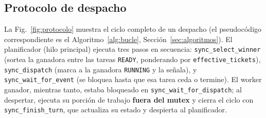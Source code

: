 \subsection{Protocolo de despacho}
\label{sec:protocolo}

La Fig.~\ref{fig:protocolo} muestra el ciclo completo de un despacho (el
pseudocódigo correspondiente es el Algoritmo~\ref{alg:bucle},
Sección~\ref{sec:algoritmos}). El planificador (hilo principal) ejecuta
tres pasos en secuencia:
\texttt{sync\_select\_winner} (sortea la ganadora entre las tareas
\texttt{READY}, ponderando por \texttt{effective\_tickets}),
\texttt{sync\_dispatch} (marca a la ganadora \texttt{RUNNING} y la señala), y
\texttt{sync\_wait\_for\_event} (se bloquea hasta que esa tarea ceda o
termine). El worker ganador, mientras tanto, estaba bloqueado en
\texttt{sync\_wait\_for\_dispatch}; al despertar, ejecuta su porción de
trabajo \textbf{fuera del mutex} y cierra el ciclo con
\texttt{sync\_finish\_turn}, que actualiza su estado y despierta al
planificador.

